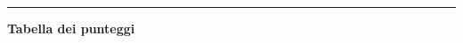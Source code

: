 \documentclass[11pt, a4paper]{exam}
\begin{document}


\noindent
\rule[2ex]{\textwidth}{1pt}

\begin{center}
{\bf Tabella dei punteggi}
\vspace{10pt}

\combinedgradetable[h][questions]
\end{center}
\end{document}
